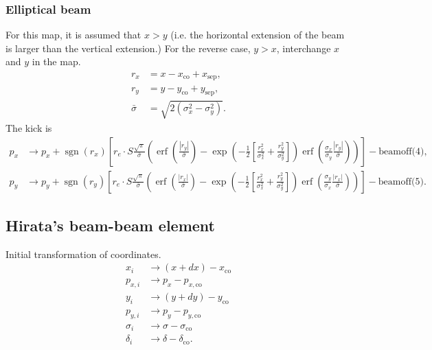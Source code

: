 \documentclass[english]{article}
\DeclareMathOperator{\sgn}{sgn}
\DeclareMathOperator{\erf}{erf}
\begin{document}
\subsubsection{Elliptical beam}
For this map, it is assumed that $x>y$ (i.e. the horizontal extension of the beam is larger than the vertical extension.) For the reverse case, $y>x$, interchange $x$ and $y$ in the map.
\begin{align}
	r_x &= x - x_{\text{co}} + x_{\text{sep}}, \\
    r_y &= y - y_{\text{co}} + y_{\text{sep}}, \\
    \bar{\sigma} &= \sqrt{2(\sigma_x^2-\sigma_y^2)}.
\end{align}
The kick is
\begin{align}
	p_x &\to p_x + \sgn(r_x)\left[r_e\cdot S \frac{\sqrt{\pi}}{\bar{\sigma}}\left(\erf\left(\frac{|r_y|}{\bar{\sigma}}\right) - \exp\left(-\frac{1}{2}\left[\frac{r_x^2}{\sigma_x^2}+\frac{r_y^2}{\sigma_y^2}\right]\right) \erf\left(\frac{\sigma_x}{\sigma_y}\frac{|r_y|}{\bar{\sigma}}\right) \right) \right] -\text{beamoff(4)}, \\
    p_y &\to p_y + \sgn(r_y)\left[r_e\cdot S \frac{\sqrt{\pi}}{\bar{\sigma}}\left(\erf\left(\frac{|r_x|}{\bar{\sigma}}\right) - \exp\left(-\frac{1}{2}\left[\frac{r_x^2}{\sigma_x^2}+\frac{r_y^2}{\sigma_y^2}\right]\right) \erf\left(\frac{\sigma_y}{\sigma_x}\frac{|r_x|}{\bar{\sigma}}\right) \right) \right] -\text{beamoff(5)}.
\end{align}



\subsection{Hirata's beam-beam element}
Initial transformation of coordinates.
\begin{align}
    x_i      & \to (x + dx) - x_{\text{co}} \\
    p_{x,i}  & \to p_x - p_{x,\text{co}} \\
    y_i      & \to (y + dy) - y_{\text{co}} \\
    p_{y,i}  & \to p_y - p_{y,\text{co}} \\
    \sigma_i &\to \sigma-\sigma_{\text{co}} \\
    \delta_i &\to \delta-\delta_{\text{co}}.
\end{align}
\end{document}
